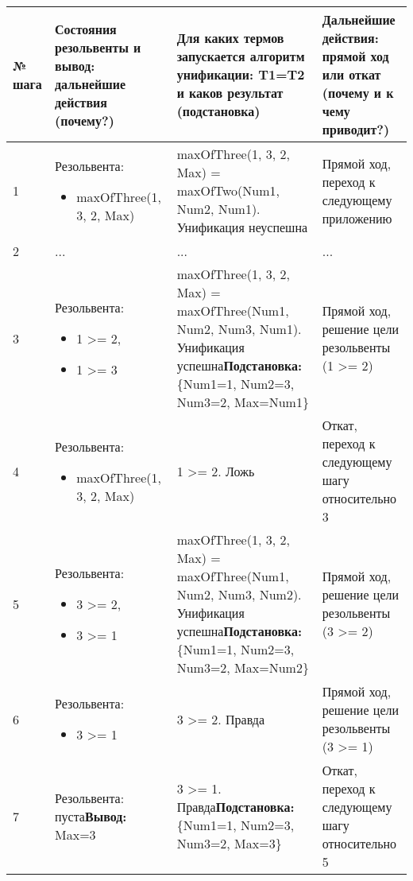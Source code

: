 \documentclass[14pt,a4paper]{scrreprt}
\begin{document}
\begin{table}[H]
	\begin{tabular}{|p{0.8cm\small}|p{4.7cm\small}|p{5.7cm\small}|p{4cm\small}|}	
		\hline
		№ шага & Состояния резольвенты и вывод: дальнейшие действия (почему?) & Для каких термов запускается алгоритм унификации: T1=T2 и каков результат (подстановка) & Дальнейшие действия: прямой ход или откат (почему и к чему приводит?)\\
		\hline
		1 & Резольвента:\begin{itemize} \item maxOfThree(1, 3, 2, Max) \end{itemize} & maxOfThree(1, 3, 2, Max) = maxOfTwo(Num1, Num2, Num1). Унификация неуспешна & Прямой ход, переход к следующему приложению\\
		\hline
		2 & ... & ... & ... \\
		\hline
		3 & Резольвента:\begin{itemize} \item 1 >= 2, \item 1 >= 3 \end{itemize}& maxOfThree(1, 3, 2, Max) = maxOfThree(Num1, Num2, Num3, Num1). Унификация успешна\linebreak \textbf{Подстановка:} \{Num1=1, Num2=3, Num3=2, Max=Num1\} & Прямой ход, решение цели резольвенты (1 >= 2) \\
		\hline
		4 & Резольвента:\begin{itemize}\item maxOfThree(1, 3, 2, Max) \end{itemize}& 1 >= 2. Ложь & Откат, переход к следующему шагу относительно 3\\
		\hline
		5 & Резольвента:\begin{itemize} \item 3 >= 2, \item 3 >= 1 \end{itemize} & maxOfThree(1, 3, 2, Max) = maxOfThree(Num1, Num2, Num3, Num2). Унификация успешна\linebreak \textbf{Подстановка:} \{Num1=1, Num2=3, Num3=2, Max=Num2\} & Прямой ход, решение цели резольвенты (3 >= 2) \\
		\hline
		6 & Резольвента:\begin{itemize}\item 3 >= 1 \end{itemize} & 3 >= 2. Правда & Прямой ход, решение цели резольвенты (3 >= 1)\\
		\hline
		7 & Резольвента: пуста\linebreak\textbf{Вывод:} Max=3 & 3 >= 1. Правда\linebreak \textbf{Подстановка:} \{Num1=1, Num2=3, Num3=2, Max=3\} & Откат, переход к следующему шагу относительно 5\\

\end{tabular}
\end{table}
\end{document}
